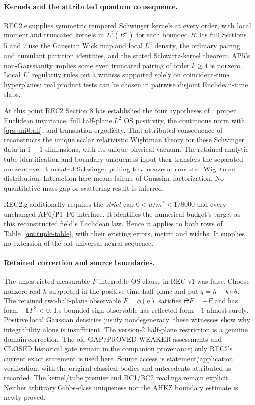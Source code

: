 \documentclass[11pt]{article}
\theoremstyle{plain}
\theoremstyle{definition}
\theoremstyle{remark}
\newcommand{\E}{\mathbb{E}}
\begin{document}
\paragraph{Kernels and the attributed quantum consequence.}
REC2.e supplies symmetric tempered Schwinger kernels at every order,
with local moment and truncated kernels in $L^2(B^k)$ for each bounded
$B$. Its full Sections 5 and 7 use the Gaussian Wick map and local
$L^2$ density, the ordinary pairing and cumulant partition identities,
and the stated Schwartz-kernel theorem. AP5's non-Gaussianity implies
some even truncated pairing of order $k\ge4$ is nonzero. Local $L^2$
regularity rules out a witness supported solely on coincident-time
hyperplanes: real product tests can be chosen in pairwise disjoint
Euclidean-time slabs.

At this point REC2 Section 8 has established the four hypotheses of
\cite[Thm.~1.0]{FS1977}: proper Euclidean invariance, full half-plane
$L^2$ OS positivity, the continuous norm with
\eqref{qrs:unitball}, and translation ergodicity. That attributed
consequence of \cite{OS1973,OS1975} reconstructs the unique scalar
relativistic Wightman theory for these Schwinger data in $1+1$ dimensions,
with its unique physical vacuum. The retained analytic tube-identification
and boundary-uniqueness input then transfers the separated nonzero even
truncated Schwinger pairing to a nonzero truncated Wightman distribution.
Interaction here means failure of Gaussian factorization. No quantitative
mass gap or scattering result is inferred.

REC2.g additionally requires the \emph{strict} cap
$0<u/m^2<1/8000$ and every unchanged AP6/P1--P6 interface. It identifies
the numerical budget's target as this reconstructed field's Euclidean
law. Hence it applies to both rows of Table~\ref{qrs:tuple-table}, with
their existing errors, metric and widths. It supplies no extension of
the old universal neural sequence.

\paragraph{Retained correction and source boundaries.}
The unrestricted measurable-$F$ integrable OS clause in REC-v1 was false.
Choose nonzero real $h$ supported in the positive-time half-plane and put
$q=h-h\circ\theta$. The retained two-half-plane observable $F=\phi(q)$
satisfies $\Theta F=-F$ and has form $-\E F^2<0$. Its bounded sign
observable has reflected form $-1$ almost surely. Positive local Gaussian
densities justify nondegeneracy; these witnesses show why integrability
alone is insufficient.
The version-2 half-plane restriction is a genuine domain correction.
The old GAP/PROVED WEAKER assessments and CLOSED historical gate remain
in the companion provenance; only REC2's current exact statement is used
here. Source access is statement/application verification, with the
original classical bodies and antecedents attributed as recorded. The
kernel/tube premise and BC1/BC2 readings remain explicit. Neither arbitrary
Gibbs-class uniqueness nor the AHKZ boundary estimate is newly proved.
\end{document}
